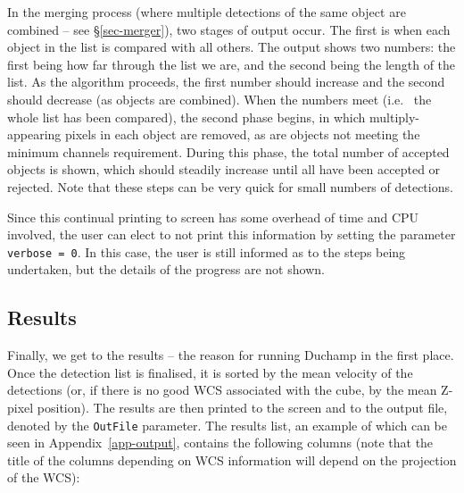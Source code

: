 \documentclass[12pt,a4paper]{article}
\newcommand{\ie}{i.e.\ }
\begin{document}
In the merging process (where multiple detections of the same object
are combined -- see \S\ref{sec-merger}), two stages of output
occur. The first is when each object in the list is compared with all
others. The output shows two numbers: the first being how far through
the list we are, and the second being the length of the list. As the
algorithm proceeds, the first number should increase and the second
should decrease (as objects are combined). When the numbers meet (\ie
the whole list has been compared), the second phase begins, in which
multiply-appearing pixels in each object are removed, as are objects
not meeting the minimum channels requirement. During this phase, the
total number of accepted objects is shown, which should steadily
increase until all have been accepted or rejected. Note that these
steps can be very quick for small numbers of detections.

Since this continual printing to screen has some overhead of time and
CPU involved, the user can elect to not print this information by
setting the parameter {\tt verbose = 0}. In this case, the user is
still informed as to the steps being undertaken, but the details of
the progress are not shown.

\subsection{Results}

Finally, we get to the results -- the reason for running Duchamp in
the first place. Once the detection list is finalised, it is sorted by
the mean velocity of the detections (or, if there is no good WCS
associated with the cube, by the mean Z-pixel position). The results
are then printed to the screen and to the output file, denoted by the
{\tt OutFile} parameter. The results list, an example of which can be
seen in Appendix~\ref{app-output}, contains the following columns
(note that the title of the columns depending on WCS information will
depend on the projection of the WCS):
\end{document}
